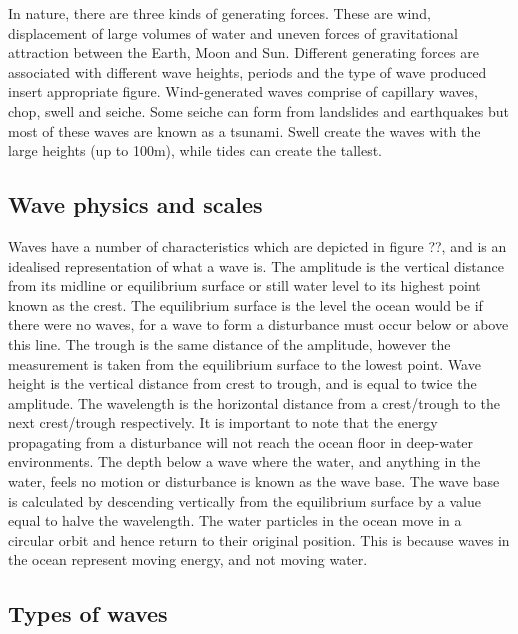\documentclass[
]{article}
\begin{document}
In nature, there are three kinds of generating forces. These are wind,
displacement of large volumes of water and uneven forces of
gravitational attraction between the Earth, Moon and Sun. Different
generating forces are associated with different wave heights, periods
and the type of wave produced insert appropriate figure. Wind-generated
waves comprise of capillary waves, chop, swell and seiche. Some seiche
can form from landslides and earthquakes but most of these waves are
known as a tsunami. Swell create the waves with the large heights (up to
100m), while tides can create the tallest.

\hypertarget{wave-physics-and-scales}{%
\subsection{Wave physics and scales}\label{wave-physics-and-scales}}

Waves have a number of characteristics which are depicted in figure ??,
and is an idealised representation of what a wave is. The amplitude is
the vertical distance from its midline or equilibrium surface or still
water level to its highest point known as the crest. The equilibrium
surface is the level the ocean would be if there were no waves, for a
wave to form a disturbance must occur below or above this line. The
trough is the same distance of the amplitude, however the measurement is
taken from the equilibrium surface to the lowest point. Wave height is
the vertical distance from crest to trough, and is equal to twice the
amplitude. The wavelength is the horizontal distance from a crest/trough
to the next crest/trough respectively. It is important to note that the
energy propagating from a disturbance will not reach the ocean floor in
deep-water environments. The depth below a wave where the water, and
anything in the water, feels no motion or disturbance is known as the
wave base. The wave base is calculated by descending vertically from the
equilibrium surface by a value equal to halve the wavelength. The water
particles in the ocean move in a circular orbit and hence return to
their original position. This is because waves in the ocean represent
moving energy, and not moving water.

\hypertarget{types-of-waves}{%
\subsection{Types of waves}\label{types-of-waves}}
\end{document}
